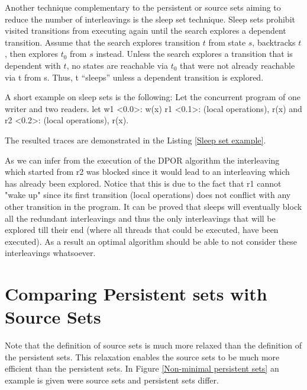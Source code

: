 Another technique complementary to the persistent or source sets aiming to reduce the number of interleavings is the sleep set technique.
Sleep sets prohibit visited transitions from executing again
until the search explores a dependent transition. Assume that
the search explores transition $t$ from state $s$, backtracks $t$,
then explores $t_0$ from $s$ instead. Unless the search explores
a transition that is dependent with $t$, no states are reachable
via $t_0$ that were not already reachable via t from s. Thus, t
“sleeps” unless a dependent transition is explored.

A short example on sleep sets is the following:
Let the concurrent program of one writer and two readers.
let w1 <0.0>: w(x) r1 <0.1>: (local operations), r(x) and r2 <0.2>: (local operations), r(x).

The resulted traces are demonstrated in the Listing \ref{Sleep set example}.


As we can infer from the execution of the DPOR algorithm the interleaving which started from r2 was blocked since it would lead to an interleaving which
has already been explored. Notice that this is due to the fact that r1 cannot "wake up" since its first transition (local operations) does not conflict with any other transition
in the program. 
It can be proved \cite{Godefroid1996} that sleeps will eventually block all the redundant interleavings and thus the only interleavings that will be explored till their end (where all threads that could be executed, have been executed).
As a result an optimal algorithm should be able to not consider these interleavings whatsoever.

\section{Comparing Persistent sets with Source Sets}

Note that the definition of source sets is much more relaxed than the definition of the persistent sets. 
This relaxation enables the source sets to be much more efficient than the persistent sets. In Figure \ref{Non-minimal persistent sets}
an example is given were source sets and persistent sets differ.

